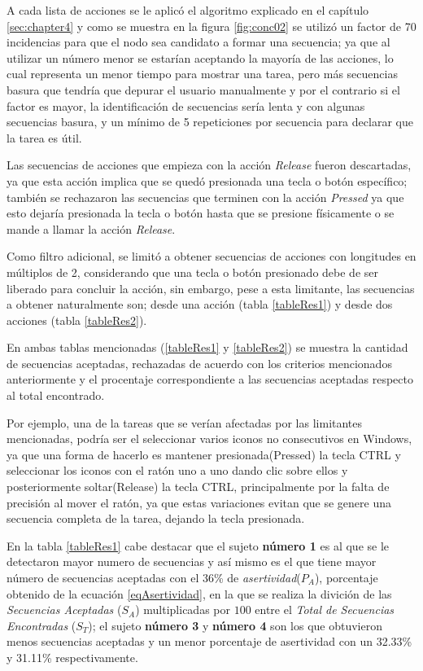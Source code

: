 A cada lista de acciones se le aplic\'o el algoritmo explicado en el
 cap\'itulo \ref{sec:chapter4} y como se muestra en la figura 
 \ref{fig:conc02} se utiliz\'o un factor de 70 incidencias para que el  nodo 
 sea candidato a formar una secuencia; ya que al utilizar un n\'umero menor 
 se estar\'ian aceptando la  mayor\'ia de las acciones, lo cual representa un 
 menor tiempo para mostrar una tarea, pero m\'as secuencias basura que 
 tendr\'ia que depurar el usuario  manualmente y por el contrario si el 
 factor es mayor, la identificaci\'on de  secuencias ser\'ia lenta y con 
 algunas secuencias basura, y un m\'inimo de 5  repeticiones por secuencia 
 para declarar que la tarea es \'util. 


Las secuencias de acciones que empieza con la acci\'on \emph{Release} fueron 
 descartadas, ya que esta acci\'on implica que se qued\'o presionada una 
 tecla o bot\'on espec\'ifico; tambi\'en se rechazaron las secuencias que 
 terminen con la acci\'on \emph{Pressed} ya que esto dejar\'ia presionada la 
 tecla o bot\'on hasta que se presione f\'isicamente o se mande a llamar la 
 acci\'on \emph{Release}.


Como filtro adicional, se limit\'o a obtener secuencias de 
 acciones con longitudes en m\'ultiplos de 2, considerando que una tecla o 
 bot\'on presionado debe de ser liberado para concluir la acci\'on, sin 
 embargo, pese a esta limitante, las secuencias a obtener naturalmente son; 
 desde una acci\'on (tabla \ref{tableRes1}) y desde dos acciones (tabla 
 \ref{tableRes2}).
 

En ambas tablas mencionadas (\ref{tableRes1} y \ref{tableRes2}) se 
 muestra la cantidad de secuencias aceptadas, rechazadas de acuerdo con los 
 criterios mencionados anteriormente y el procentaje correspondiente a las 
 secuencias aceptadas respecto al total encontrado. 
 
 
Por ejemplo, una de la tareas que se ver\'ian afectadas por las limitantes
 mencionadas, podr\'ia ser el seleccionar varios iconos no consecutivos en 
 Windows, ya que una forma de hacerlo es mantener presionada(Pressed) la
 tecla CTRL y seleccionar los iconos con el rat\'on uno a uno dando clic 
 sobre ellos y posteriormente soltar(Release) la tecla CTRL, principalmente 
 por la falta de precisi\'on al mover el rat\'on, ya que estas variaciones 
 evitan que se genere una secuencia completa de la tarea, dejando la tecla 
 presionada.


En la tabla \ref{tableRes1} cabe destacar que el sujeto \textbf{n\'umero 1}
 es al que se le detectaron mayor numero de secuencias y as\'i mismo es el 
 que tiene mayor n\'umero de secuencias aceptadas con el 36\% de
 \emph{asertividad}($P_A$), porcentaje obtenido de la ecuaci\'on
 \ref{eqAsertividad}, en la que se realiza la divici\'on de las 
 \emph{Secuencias Aceptadas} ($S_A$) multiplicadas por $100$ entre el 
 \emph{Total de Secuencias Encontradas} ($S_T$); el sujeto \textbf{n\'umero 
 3} y \textbf{n\'umero 4} son los que obtuvieron menos secuencias aceptadas y 
 un menor porcentaje de asertividad con un 32.33\% y 31.11\% respectivamente.


